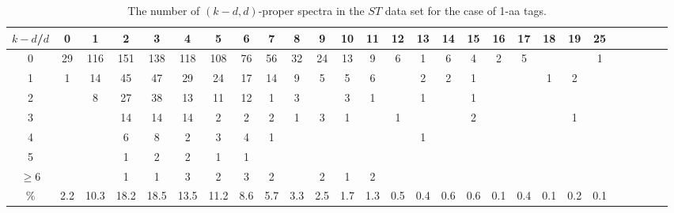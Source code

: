 \documentclass{article}[12pt]
\begin{document}
\begin{landscape}

\begin{table}[h]\footnotesize
{\centering
\begin{tabular}{|c|c|
c|c|c|c|c|c|c|c|c|c|c|c|c|c|c|c|c|c|c|c|c|c|c|c|c|}
  \hline
  $k-d$/$d$ 
 & 0 & 1 & 2 & 3 & 4 & 5 & 6 & 7 & 8 & 9 & 10 & 11 & 12 & 13 & 14 & 15 & 16 & 17 & 18 & 19 & 25\\

  \hline
  \hline

0 & 29 & 116 & 151 & 138 & 118 & 108 & 76 & 56 & 32 & 24 & 13 & 9 & 6 & 1 & 6 & 4 & 2 & 5 &  &  & 1\\

1 & 1 & 14 & 45 & 47 & 29 & 24 & 17 & 14 & 9 & 5 & 5 & 6 &  & 2 & 2 & 1 &  &  & 1 & 2 & \\

2 &  & 8 & 27 & 38 & 13 & 11 & 12 & 1 & 3 &  & 3 & 1 &  & 1 &  & 1 &  &  &  &  & \\

3 &  &  & 14 & 14 & 14 & 2 & 2 & 2 & 1 & 3 & 1 &  & 1 &  &  & 2 &  &  &  & 1 & \\

4 &  &  & 6 & 8 & 2 & 3 & 4 & 1 &  &  &  &  &  & 1 &  &  &  &  &  &  & \\

5 &  &  & 1 & 2 & 2 & 1 & 1 &  &  &  &  &  &  &  &  &  &  &  &  &  & \\

$\ge6 $  &  &  & 1 & 1 & 3 & 2 & 3 & 2 &  & 2 & 1 & 2 &  &  &  &  &  &  &  &  & \\

  \hline

 \%  & 2.2 & 10.3 & 18.2 & 18.5 & 13.5 & 11.2 & 8.6 & 5.7 & 3.3 & 2.5 & 1.7 & 1.3 & 0.5 & 0.4 & 0.6 & 0.6 & 0.1 & 0.4 & 0.1 & 0.2 & 0.1\\

  \hline
\end{tabular}
\par}
\centering
\caption{The number of $(k-d,d)$-proper spectra in the $ST$ data set for the case of 1-aa tags.}
\vspace{3mm}
\label{table:kd-1-proper-ST2}
\end{table}
\end{landscape}
\end{document}
